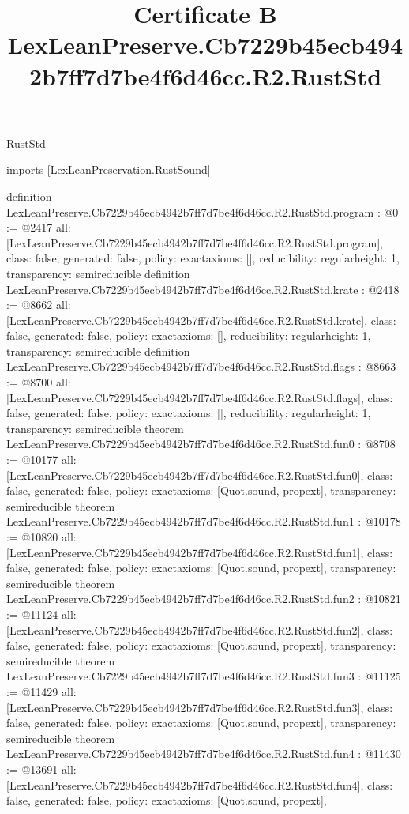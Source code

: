 \begin{lexlean}{RustStd}
\title{Certificate B LexLeanPreserve.Cb7229b45ecb4942b7ff7d7be4f6d46cc.R2.RustStd}
\begin{coremodule}
imports [LexLeanPreservation.RustSound]

definition LexLeanPreserve.Cb7229b45ecb4942b7ff7d7be4f6d46cc.R2.RustStd.program : @0 := @2417 {
  all: [LexLeanPreserve.Cb7229b45ecb4942b7ff7d7be4f6d46cc.R2.RustStd.program],
  class: false,
  generated: false,
  policy: exact{axioms: []},
  reducibility: regular{height: 1},
  transparency: semireducible
}
definition LexLeanPreserve.Cb7229b45ecb4942b7ff7d7be4f6d46cc.R2.RustStd.krate : @2418 := @8662 {
  all: [LexLeanPreserve.Cb7229b45ecb4942b7ff7d7be4f6d46cc.R2.RustStd.krate],
  class: false,
  generated: false,
  policy: exact{axioms: []},
  reducibility: regular{height: 1},
  transparency: semireducible
}
definition LexLeanPreserve.Cb7229b45ecb4942b7ff7d7be4f6d46cc.R2.RustStd.flags : @8663 := @8700 {
  all: [LexLeanPreserve.Cb7229b45ecb4942b7ff7d7be4f6d46cc.R2.RustStd.flags],
  class: false,
  generated: false,
  policy: exact{axioms: []},
  reducibility: regular{height: 1},
  transparency: semireducible
}
theorem LexLeanPreserve.Cb7229b45ecb4942b7ff7d7be4f6d46cc.R2.RustStd.fun0 : @8708 := @10177 {
  all: [LexLeanPreserve.Cb7229b45ecb4942b7ff7d7be4f6d46cc.R2.RustStd.fun0],
  class: false,
  generated: false,
  policy: exact{axioms: [Quot.sound, propext]},
  transparency: semireducible
}
theorem LexLeanPreserve.Cb7229b45ecb4942b7ff7d7be4f6d46cc.R2.RustStd.fun1 : @10178 := @10820 {
  all: [LexLeanPreserve.Cb7229b45ecb4942b7ff7d7be4f6d46cc.R2.RustStd.fun1],
  class: false,
  generated: false,
  policy: exact{axioms: [Quot.sound, propext]},
  transparency: semireducible
}
theorem LexLeanPreserve.Cb7229b45ecb4942b7ff7d7be4f6d46cc.R2.RustStd.fun2 : @10821 := @11124 {
  all: [LexLeanPreserve.Cb7229b45ecb4942b7ff7d7be4f6d46cc.R2.RustStd.fun2],
  class: false,
  generated: false,
  policy: exact{axioms: [Quot.sound, propext]},
  transparency: semireducible
}
theorem LexLeanPreserve.Cb7229b45ecb4942b7ff7d7be4f6d46cc.R2.RustStd.fun3 : @11125 := @11429 {
  all: [LexLeanPreserve.Cb7229b45ecb4942b7ff7d7be4f6d46cc.R2.RustStd.fun3],
  class: false,
  generated: false,
  policy: exact{axioms: [Quot.sound, propext]},
  transparency: semireducible
}
theorem LexLeanPreserve.Cb7229b45ecb4942b7ff7d7be4f6d46cc.R2.RustStd.fun4 : @11430 := @13691 {
  all: [LexLeanPreserve.Cb7229b45ecb4942b7ff7d7be4f6d46cc.R2.RustStd.fun4],
  class: false,
  generated: false,
  policy: exact{axioms: [Quot.sound, propext]},
}
\end{coremodule}
\end{lexlean}
